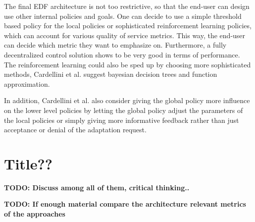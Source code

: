         \quad The final EDF architecture is not too restrictive, so that the end-user can design use other internal policies and goals. 
        One can decide to use a simple threshold based policy for the local policies or sophisticated reinforcement learning policies, which can account for various 
        quality of service metrics. This way, the end-user can decide which metric they want to emphasize on.
        Furthermore, a fully decentralized control solution shows to be very good in terms of performance.
        The reinforcement learning could also be sped up by choosing more sophisticated methods, Cardellini et al. suggest bayesian decision trees and function approximation.

        \quad In addition, Cardellini et al. also consider giving the global policy more influence on the lower level policies by letting the 
        global policy adjust the parameters of the local policies or simply giving more informative feedback rather than just acceptance or denial of the adaptation request.


    \section{Title??}
    \textbf{TODO: Discuss among all of them, critical thinking..}

    \textbf{TODO: If enough material compare the architecture relevant metrics of the approaches}